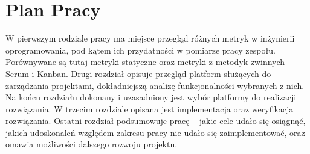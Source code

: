 \section*{Plan Pracy}
W pierwszym rodziale pracy ma miejsce przegląd różnych metryk w inżynierii oprogramowania, pod kątem ich przydatności w pomiarze pracy zespołu.
Porównywane są tutaj metryki statyczne oraz metryki z metodyk zwinnych Scrum i Kanban.
Drugi rozdział opisuje przegląd platform służących do zarządzania projektami, dokładniejszą analizę funkcjonalności wybranych z nich.
Na końcu rozdziału dokonany i uzasadniony jest wybór platformy do realizacji rozwiązania.
W trzecim rozdziale opisana jest implementacja oraz weryfikacja rozwiązania.
Ostatni rozdział podsumowuje pracę -- jakie cele udało się osiągnąć, jakich udoskonaleń względem zakresu pracy nie udało się zaimplementować, oraz
omawia możliwości dalszego rozwoju projektu.
